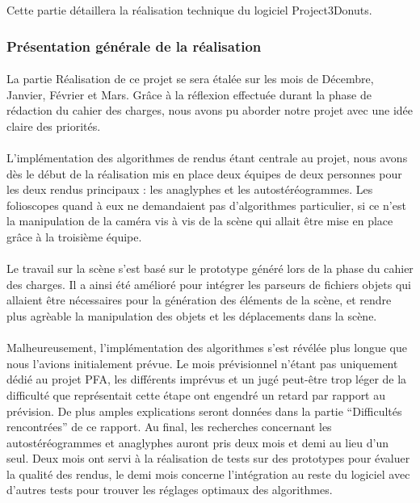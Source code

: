 Cette partie détaillera la réalisation technique du logiciel Project3Donuts.

\subsubsection{Présentation générale de la réalisation}
\paragraph{}
La partie Réalisation de ce projet se sera étalée sur les mois de Décembre, Janvier, Février et Mars. Grâce à la réflexion effectuée durant la phase de rédaction du cahier des charges, nous avons pu aborder notre projet avec une idée claire des priorités.

\paragraph{}
L'implémentation des algorithmes de rendus étant centrale au projet, nous avons dès le début de la réalisation mis en place deux équipes de deux personnes pour les deux rendus principaux : les anaglyphes et les autostéréogrammes. Les folioscopes quand à eux ne demandaient pas d'algorithmes particulier, si ce n'est la manipulation de la caméra vis à vis de la scène qui allait être mise en place grâce à la troisième équipe.

\paragraph{}
Le travail sur la scène s'est basé sur le prototype généré lors de la phase du cahier des charges. Il a ainsi été amélioré pour intégrer les parseurs de fichiers objets qui allaient être nécessaires pour la génération des éléments de la scène, et rendre plus agrèable la manipulation des objets et les déplacements dans la scène.

\paragraph{}
Malheureusement, l'implémentation des algorithmes s'est révélée plus longue que nous l'avions initialement prévue. Le mois prévisionnel n'étant pas uniquement dédié au projet PFA, les différents imprévus et un jugé peut-être trop léger de la difficulté que représentait cette étape ont engendré un retard par rapport au prévision. De plus amples explications seront données dans la partie ``Difficultés rencontrées'' de ce rapport. 
Au final, les recherches concernant les autostéréogrammes et anaglyphes auront pris deux mois et demi au lieu d'un seul. Deux mois ont servi à la réalisation de tests sur des prototypes pour évaluer la qualité des rendus, le demi mois concerne l'intégration au reste du logiciel avec d'autres tests pour trouver les réglages optimaux des algorithmes.

